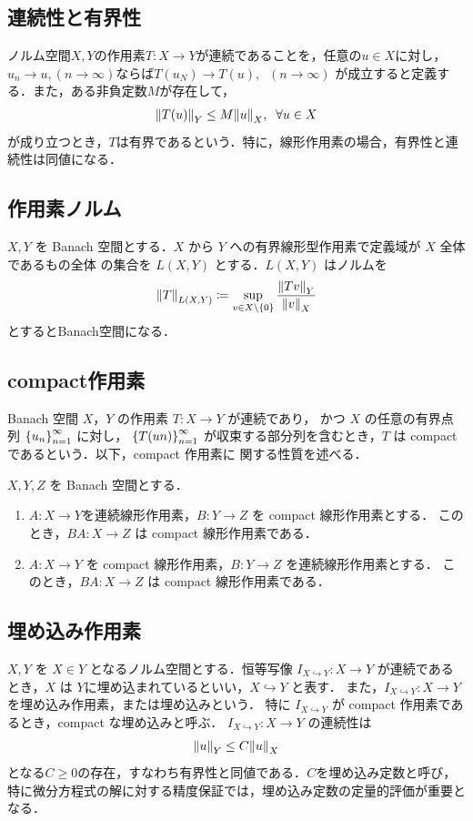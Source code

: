 \subsection{連続性と有界性}
ノルム空間\(X,Y\)の作用素\(T : X \rightarrow Y\)が連続であることを，任意の\(u\in X\)に対し，
\(u_n\rightarrow u,(n\rightarrow \infty)\)ならば\(T(u_N)\rightarrow T(u),\;\;(n\rightarrow \infty)\)
が成立すると定義する．また，ある非負定数\(M\)が存在して，
\begin{align}
    \norm{T(u)}_Y \leq M \norm{u}_X,\;\; \forall u\in X
\end{align}
が成り立つとき，\(T\)は有界であるという．特に，線形作用素の場合，有界性と連続性は同値になる．
\subsection{作用素ノルム}
\(X, Y\) を Banach 空間とする．\(X\) から \(Y\) への有界線形型作用素で定義域が \(X\) 全体であるもの全体
の集合を \(L(X, Y )\) とする．\(L(X, Y )\) はノルムを
\begin{align}
    \norm{T}_{L(X,Y)} \coloneqq \sup\limits_{v \in X \backslash \{ 0 \} }\dfrac{\norm{Tv}_Y}{\norm{v}_X}
\end{align}
とするとBanach空間になる．
\subsection{compact作用素}
Banach 空間 \(X\)，\(Y\) の作用素 \(T : X \rightarrow Y\) が連続であり，
かつ \(X\) の任意の有界点列 \(\qty{u_n}^\infty_{n=1}\) に対し，
\(\qty{T(un)}^\infty_{n=1}\) が収束する部分列を含むとき，\(T\) は compact であるという．以下，compact 作用素に
関する性質を述べる．
\begin{定理} 
    \(X,Y,Z\) を Banach 空間とする．
    \begin{enumerate}[(1)]
        \item \( A:X\rightarrow Y \)を連続線形作用素，\(B:Y\rightarrow Z\) を compact 線形作用素とする．
        このとき，\(BA:X\rightarrow Z\) は compact 線形作用素である．
        \item \(A:X\rightarrow Y\) を compact 線形作用素，\(B:Y\rightarrow Z\) を連続線形作用素とする． 
        このとき，\(BA:X\rightarrow Z\) は compact 線形作用素である．
    \end{enumerate}
\end{定理}

\subsection{埋め込み作用素}
\(X,Y\) を \(X \in Y\) となるノルム空間とする．恒等写像 \(I_{X \hookrightarrow Y}:X \rightarrow Y \) 
が連続であるとき，\(X\) は \(Y\)に埋め込まれているといい，\(X \hookrightarrow Y\) と表す．
また，\(I_{X \hookrightarrow Y}:X \rightarrow Y \) を埋め込み作用素，または埋め込みという．
特に \(I_{X \hookrightarrow Y}\) が compact 作用素であるとき，compact な埋め込みと呼ぶ．
\(I_{X \hookrightarrow Y}:X \rightarrow Y \) の連続性は
\begin{align}
    \norm{u}_Y \leq C\norm{u}_X
\end{align}
となる\(C \geq 0\)の存在，すなわち有界性と同値である．\(C\)を埋め込み定数と呼び，
特に微分方程式の解に対する精度保証では，埋め込み定数の定量的評価が重要となる．

